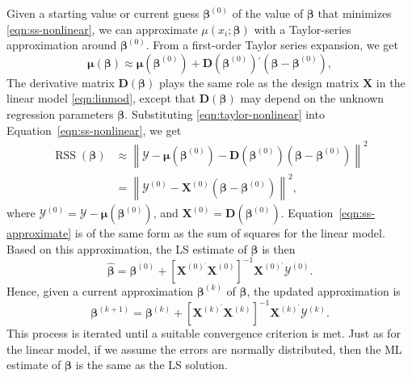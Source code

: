\documentclass[cmfont,usenames,dvipsnames,leqno]{afit-etd}\usepackage[]{graphicx}\usepackage[]{color}
\newcommand{\norm}[1]{\left\|#1\right\|}
\newcommand{\trans}{\ensuremath{^\prime}}
\newcommand{\bc}[1]{\ensuremath{\bm{\mathcal{#1}}}}
\newcommand{\wh}[1]{\ensuremath{\widehat{#1}}}
\newcommand{\X}{\ensuremath{\bm{X}}}
\newcommand{\RSS}{\operatorname{RSS}}
\begin{document}
Given a starting value or current guess $\bm{\beta}^{(0)}$ of the value of $\bm{\beta}$ that minimizes \eqref{eqn:ss-nonlinear}, we can approximate $\mu(x_i; \bm{\beta})$ with a Taylor-series approximation around $\bm{\beta}^{(0)}$. From a first-order Taylor series expansion, we get
\begin{equation}
\label{eqn:taylor-nonlinear}
  \bm{\mu}(\bm{\beta}) \approx \bm{\mu}(\bm{\beta}^{(0)}) + \bm{D}(\bm{\beta}^{(0)})\trans(\bm{\beta} -\bm{\beta}^{(0)}),
\end{equation}
The derivative matrix $\bm{D}(\bm{\beta})$ plays the same role as the design matrix $\X$ in the linear model \eqref{eqn:linmod}, except that $\bm{D}(\bm{\beta})$ may depend on the unknown regression parameters $\bm{\beta}$. Substituting \eqref{eqn:taylor-nonlinear} into Equation~\eqref{eqn:ss-nonlinear}, we get 
\begin{align}
  \RSS(\bm{\beta}) &\approx \norm{\bc{Y} - \bm{\mu}(\bm{\beta}^{(0)}) - \bm{D}(\bm{\beta}^{(0)})(\bm{\beta} - \bm{\beta}^{(0)})}^2 \label{eqn:ss-approximate} \\
  &= \norm{\bc{Y}^{(0)} - \X^{(0)}(\bm{\beta} - \bm{\beta}^{(0)})}^2,
\end{align}
where $\bc{Y}^{(0)} = \bc{Y} - \bm{\mu}(\bm{\beta}^{(0)})$, and $\X^{(0)} = \bm{D}(\bm{\beta}^{(0)})$. Equation~\eqref{eqn:ss-approximate} is of the same form as the sum of squares for the linear model. Based on this approximation, the \ac{LS} estimate of $\bm{\beta}$ is then
\begin{equation*}
  \wh{\bm{\beta}} = \bm{\beta}^{(0)} + \left[ \X^{(0)\trans}\X^{(0)} \right]^{-1}\X^{(0)\trans}\bc{Y}^{(0)}.
\end{equation*}
Hence, given a current approximation $\bm{\beta}^{(k)}$ of $\bm{\beta}$, the updated approximation is 
\begin{equation*}
  \bm{\beta}^{(k + 1)} = \bm{\beta}^{(k)} + \left[ \X^{(k)\trans}\X^{(k)} \right]^{-1}\X^{(k)\trans}\bc{Y}^{(k)}.
\end{equation*}
This process is iterated until a suitable convergence criterion is met. Just as for the linear model, if we assume the errors are normally distributed, then the \ac{ML} estimate of  $\bm{\beta}$ is the same as the \ac{LS} solution.
\end{document}
